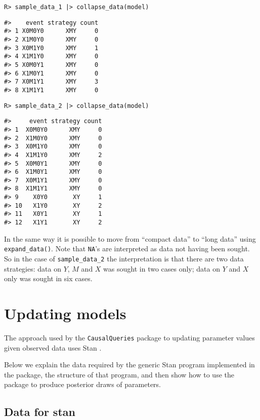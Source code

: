 \documentclass[
  11pt,
  article]{jss}
\begin{document}
\begin{verbatim}
R> sample_data_1 |> collapse_data(model)
\end{verbatim}

\begin{verbatim}
#>    event strategy count
#> 1 X0M0Y0      XMY     0
#> 2 X1M0Y0      XMY     0
#> 3 X0M1Y0      XMY     1
#> 4 X1M1Y0      XMY     0
#> 5 X0M0Y1      XMY     0
#> 6 X1M0Y1      XMY     0
#> 7 X0M1Y1      XMY     3
#> 8 X1M1Y1      XMY     0
\end{verbatim}

\begin{verbatim}
R> sample_data_2 |> collapse_data(model)
\end{verbatim}

\begin{verbatim}
#>     event strategy count
#> 1  X0M0Y0      XMY     0
#> 2  X1M0Y0      XMY     0
#> 3  X0M1Y0      XMY     0
#> 4  X1M1Y0      XMY     2
#> 5  X0M0Y1      XMY     0
#> 6  X1M0Y1      XMY     0
#> 7  X0M1Y1      XMY     0
#> 8  X1M1Y1      XMY     0
#> 9    X0Y0       XY     1
#> 10   X1Y0       XY     2
#> 11   X0Y1       XY     1
#> 12   X1Y1       XY     2
\end{verbatim}

In the same way it is possible to move from ``compact data'' to ``long
data'' using \texttt{expand\_data()}. Note that \texttt{NA}'s are
interpreted as data not having been sought. So in the case of
\texttt{sample\_data\_2} the interpretation is that there are two data
strategies: data on \(Y\), \(M\) and \(X\) was sought in two cases only;
data on \(Y\) and \(X\) only was sought in six cases.

\hypertarget{sec-update}{%
\section{Updating models}\label{sec-update}}

The approach used by the \texttt{CausalQueries} package to updating
parameter values given observed data uses Stan
\citep{carpenter2017stan}.

Below we explain the data required by the generic Stan program
implemented in the package, the structure of that program, and then show
how to use the package to produce posterior draws of parameters.

\hypertarget{data-for-stan}{%
\subsection{Data for stan}\label{data-for-stan}}
\end{document}
